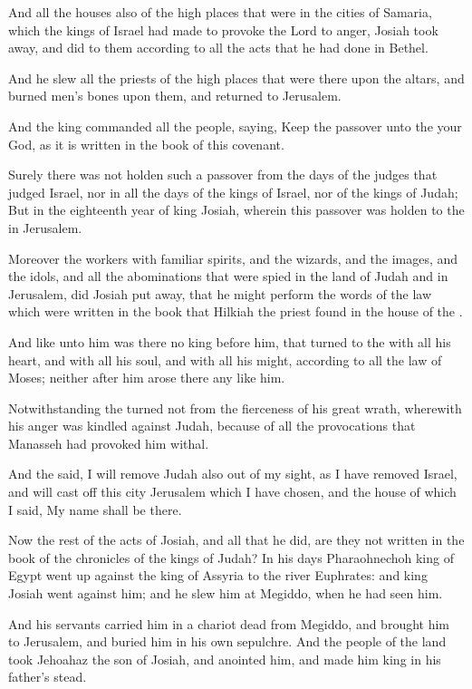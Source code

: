 \verse And all the houses also of the high places that were in the cities of Samaria, which the kings of Israel had made to provoke the Lord to anger, Josiah took away, and did to them according to all the acts that he had done in Bethel.

\verse And he slew all the priests of the high places that were there upon the altars, and burned men's bones upon them, and returned to Jerusalem.

\verse And the king commanded all the people, saying, Keep the passover unto the \LORD your God, as it is written in the book of this covenant.

\verse Surely there was not holden such a passover from the days of the judges that judged Israel, nor in all the days of the kings of Israel, nor of the kings of Judah; \verse But in the eighteenth year of king Josiah, wherein this passover was holden to the \LORD in Jerusalem.

\verse Moreover the workers with familiar spirits, and the wizards, and the images, and the idols, and all the abominations that were spied in the land of Judah and in Jerusalem, did Josiah put away, that he might perform the words of the law which were written in the book that Hilkiah the priest found in the house of the \LORD.

\verse And like unto him was there no king before him, that turned to the \LORD with all his heart, and with all his soul, and with all his might, according to all the law of Moses; neither after him arose there any like him.

\verse Notwithstanding the \LORD turned not from the fierceness of his great wrath, wherewith his anger was kindled against Judah, because of all the provocations that Manasseh had provoked him withal.

\verse And the \LORD said, I will remove Judah also out of my sight, as I have removed Israel, and will cast off this city Jerusalem which I have chosen, and the house of which I said, My name shall be there.

\verse Now the rest of the acts of Josiah, and all that he did, are they not written in the book of the chronicles of the kings of Judah?  \verse In his days Pharaohnechoh king of Egypt went up against the king of Assyria to the river Euphrates: and king Josiah went against him; and he slew him at Megiddo, when he had seen him.

\verse And his servants carried him in a chariot dead from Megiddo, and brought him to Jerusalem, and buried him in his own sepulchre. And the people of the land took Jehoahaz the son of Josiah, and anointed him, and made him king in his father's stead.

